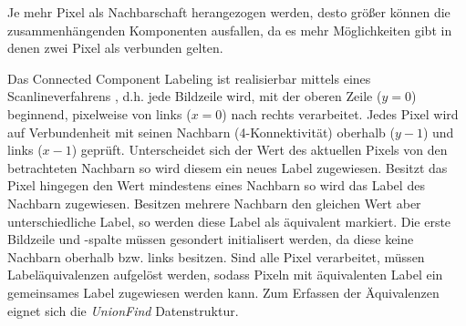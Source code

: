 %
Je mehr Pixel als Nachbarschaft herangezogen werden, desto größer können die zusammenhängenden Komponenten ausfallen, da es mehr Möglichkeiten gibt in denen zwei Pixel als verbunden gelten.

Das Connected Component Labeling ist realisierbar mittels eines Scanlineverfahrens \cite[S.~69--75]{compvis2001}, d.h. jede Bildzeile wird, mit der oberen Zeile ($y=0$) beginnend, pixelweise von links ($x=0$) nach rechts verarbeitet.
Jedes Pixel wird auf Verbundenheit mit seinen Nachbarn (4-Konnektivität) oberhalb ($y-1$) und links ($x-1$) geprüft.
Unterscheidet sich der Wert des aktuellen Pixels von den betrachteten Nachbarn so wird diesem ein neues Label zugewiesen.
Besitzt das Pixel hingegen den Wert mindestens eines Nachbarn so wird das Label des Nachbarn zugewiesen.
Besitzen mehrere Nachbarn den gleichen Wert aber unterschiedliche Label, so werden diese Label als äquivalent markiert.
Die erste Bildzeile und -spalte müssen gesondert initialisert werden, da diese keine Nachbarn oberhalb bzw. links besitzen.
Sind alle Pixel verarbeitet, müssen Labeläquivalenzen aufgelöst werden, sodass Pixeln mit äquivalenten Label ein gemeinsames Label zugewiesen werden kann. Zum Erfassen der Äquivalenzen eignet sich die \emph{UnionFind} Datenstruktur.
